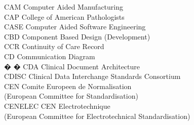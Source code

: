 \begin{tabbing}
    \>CAM \>\>Computer Aided Manufacturing\\

    \>CAP \>\>College of American Pathologists\\



    \>CASE \>\>Computer Aided Software Engineering\\



    \>CBD \>\>Component Based Design (Development)\\



    \>CCR \>\>Continuity of Care Record\\




    \>CD \>\>Communication Diagram\\

� � \>CDA \>\>Clinical Document Architecture\\



    \>CDISC \>\>Clinical Data Interchange Standards Consortium\\

    \>CEN \>\>Comite Europeen de Normalisation\\
        \>\>\>(European Committee for Standardisation)\\

    \>CENELEC \>\>CEN Electrotechnique\\
        \>\>\>(European Committee for Electrotechnical Standardisation)\\


\end{tabbing}
